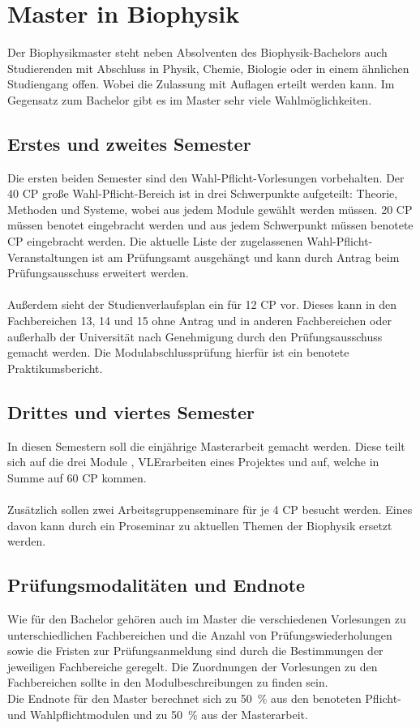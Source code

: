 \section{Master in Biophysik}
\bigskip
%
Der Biophysikmaster steht neben Absolventen des Biophysik-Bachelors auch Studierenden mit Abschluss in Physik, Chemie, Biologie oder in einem ähnlichen Studiengang offen. Wobei die Zulassung mit Auflagen erteilt werden kann. Im Gegensatz zum Bachelor gibt es im Master sehr viele Wahlmöglichkeiten.
%
\subsection{Erstes und zweites Semester}
Die ersten beiden Semester sind den Wahl-Pflicht-Vorlesungen vorbehalten. Der 40 CP große Wahl-Pflicht-Bereich ist in drei Schwerpunkte aufgeteilt: Theorie, Methoden und Systeme, wobei aus jedem Module gewählt werden müssen. 20 CP müssen benotet eingebracht werden und aus jedem Schwerpunkt müssen benotete CP eingebracht werden. Die aktuelle Liste der zugelassenen Wahl-Pflicht-Veranstaltungen ist am Prüfungsamt ausgehängt und kann durch Antrag beim Prüfungsausschuss erweitert werden.\\
\bigskip\\
Außerdem sieht der Studienverlaufsplan ein  für 12 CP vor. Dieses kann in den Fachbereichen 13, 14 und 15 ohne Antrag und in anderen Fachbereichen oder außerhalb der Universität nach Genehmigung durch den Prüfungsausschuss gemacht werden. Die Modulabschlussprüfung hierfür ist ein benotete Praktikumsbericht. 
%
%
\subsection{Drittes und viertes Semester}
In diesen Semestern soll die einjährige Masterarbeit gemacht werden. Diese teilt sich auf die drei Module , VL{Erarbeiten eines Projektes} und  auf, welche in Summe auf 60 CP kommen.\\
\bigskip\\
Zusätzlich sollen zwei Arbeitsgruppenseminare für je 4 CP besucht werden. Eines davon kann durch ein Proseminar zu aktuellen Themen der Biophysik ersetzt werden. 
%
%
\subsection{Prüfungsmodalitäten und Endnote}
Wie für den Bachelor gehören auch im Master die verschiedenen Vorlesungen zu unterschiedlichen Fachbereichen und die Anzahl von Prüfungswiederholungen sowie die Fristen zur Prüfungsanmeldung sind durch die Bestimmungen der jeweiligen Fachbereiche geregelt. Die Zuordnungen der Vorlesungen zu den Fachbereichen sollte in den Modulbeschreibungen zu finden sein.
\bigskip\\
%
Die Endnote für den Master berechnet sich zu 50~\% aus den benoteten Pflicht- und Wahlpflichtmodulen und zu 50~\% aus der Masterarbeit.
%
%


